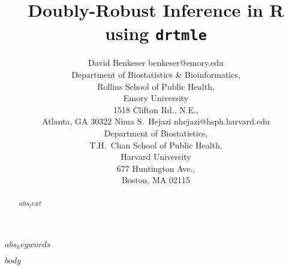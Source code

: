 \documentclass[twoside,11pt]{article}
\begin{document}
\title{Doubly-Robust Inference in R using \texttt{drtmle}}

\author{%
  \name David Benkeser \email benkeser@emory.edu\\
  \addr Department of Biostatistics \& Bioinformatics,\\
  Rollins School of Public Health,\\
  Emory University\\
  1518 Clifton Rd., N.E.,\\
  Atlanta, GA 30322
  \AND
  \name Nima S.~Hejazi \email nhejazi@hsph.harvard.edu\\
  \addr Department of Biostatistics,\\
  T.H.~Chan School of Public Health,\\
  Harvard University\\
  677 Huntington Ave.,\\
  Boston, MA 02115
}

\maketitle

\begin{abstract}
$abs_text$
\end{abstract}

\begin{keywords}
$abs_keywords$
\end{keywords}

$body$
\end{document}
